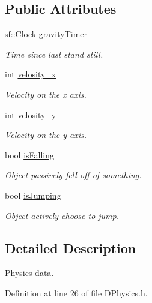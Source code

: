 \subsection*{Public Attributes}
\begin{DoxyCompactItemize}
\item 
sf\-::\-Clock \hyperlink{structDPhysics_1_1SPhysics_aee2f0f80a53a905eb9de32d3bb12e318}{gravity\-Timer}
\begin{DoxyCompactList}\small\item\em Time since last stand still. \end{DoxyCompactList}\item 
int \hyperlink{structDPhysics_1_1SPhysics_a2654e1fd65ea35fe4119c7866fd46274}{velosity\-\_\-x}
\begin{DoxyCompactList}\small\item\em Velocity on the x axis. \end{DoxyCompactList}\item 
int \hyperlink{structDPhysics_1_1SPhysics_a58c1f8fa61d0aeece450d7ab789c5013}{velosity\-\_\-y}
\begin{DoxyCompactList}\small\item\em Velocity on the y axis. \end{DoxyCompactList}\item 
bool \hyperlink{structDPhysics_1_1SPhysics_a39163a65d84fc6d7fd0be57560cffe12}{is\-Falling}
\begin{DoxyCompactList}\small\item\em Object passively fell off of something. \end{DoxyCompactList}\item 
bool \hyperlink{structDPhysics_1_1SPhysics_a6fc3e1a46d84fb6dec9f198bb6513856}{is\-Jumping}
\begin{DoxyCompactList}\small\item\em Object actively choose to jump. \end{DoxyCompactList}\end{DoxyCompactItemize}


\subsection{Detailed Description}
Physics data. 

Definition at line 26 of file D\-Physics.\-h.



